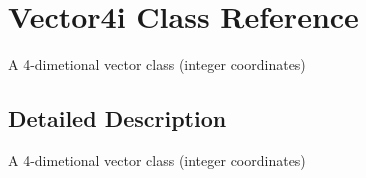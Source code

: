 \hypertarget{class_vector4i}{\section{Vector4i Class Reference}
\label{class_vector4i}
}


A 4-\/dimetional vector class (integer coordinates)  




\subsection{Detailed Description}
A 4-\/dimetional vector class (integer coordinates) 